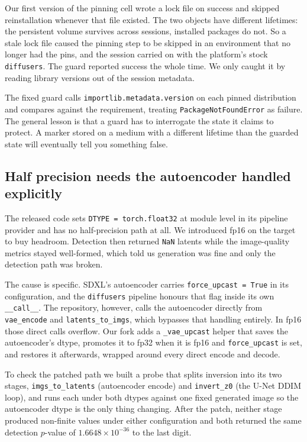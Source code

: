 \documentclass[10pt,twocolumn]{article}
\newcommand{\code}[1]{\texttt{\small #1}}
\begin{document}
Our first version of the pinning cell wrote a lock file on success and skipped
reinstallation whenever that file existed. The two objects have different lifetimes:
the persistent volume survives across sessions, installed packages do not. So a stale
lock file caused the pinning step to be skipped in an environment that no longer had
the pins, and the session carried on with the platform's stock \code{diffusers}. The
guard reported success the whole time. We only caught it by reading library versions
out of the session metadata.

The fixed guard calls \code{importlib.metadata.version} on each pinned distribution
and compares against the requirement, treating \code{PackageNotFoundError} as failure.
The general lesson is that a guard has to interrogate the state it claims to protect.
A marker stored on a medium with a different lifetime than the guarded state will
eventually tell you something false.

\subsection{Half precision needs the autoencoder handled explicitly}
\label{sec:fp16}

The released code sets \code{DTYPE = torch.float32} at module level in its pipeline
provider and has no half-precision path at all. We introduced fp16 on the target to
buy headroom. Detection then returned \code{NaN} latents while the image-quality
metrics stayed well-formed, which told us generation was fine and only the detection
path was broken.

The cause is specific. SDXL's autoencoder carries \code{force\_upcast = True} in its
configuration, and the \code{diffusers} pipeline honours that flag inside its own
\code{\_\_call\_\_}. The repository, however, calls the autoencoder directly from
\code{vae\_encode} and \code{latents\_to\_imgs}, which bypasses that handling
entirely. In fp16 those direct calls overflow. Our fork adds a
\code{\_vae\_upcast} helper that saves the autoencoder's dtype, promotes it to fp32
when it is fp16 and \code{force\_upcast} is set, and restores it afterwards, wrapped
around every direct encode and decode.

To check the patched path we built a probe that splits inversion into its two stages,
\code{imgs\_to\_latents} (autoencoder encode) and \code{invert\_z0} (the U-Net DDIM
loop), and runs each under both dtypes against one fixed generated image so the
autoencoder dtype is the only thing changing. After the patch, neither stage produced
non-finite values under either configuration and both returned the same detection
$p$-value of $1.6648 \times 10^{-36}$ to the last digit.
\end{document}
